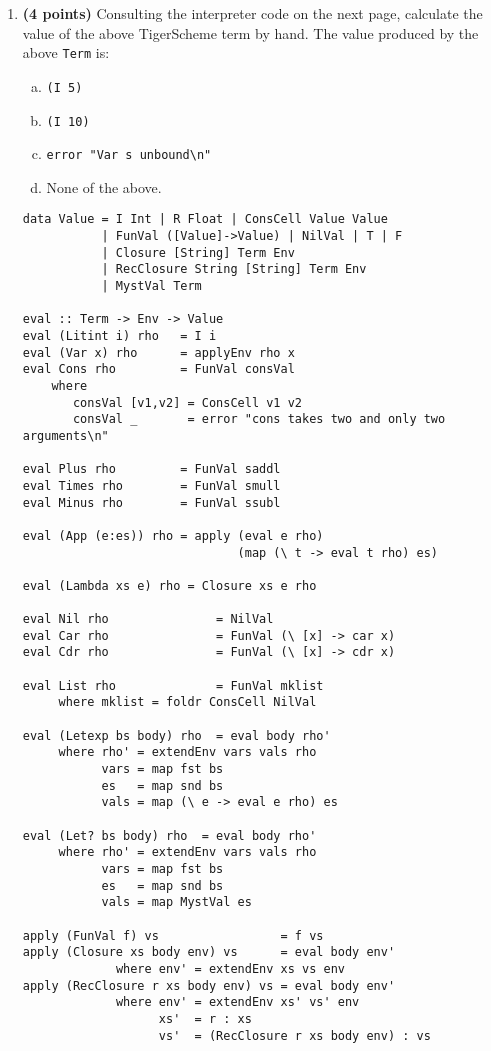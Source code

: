 \documentclass[12pt]{article}
\begin{document}
\begin{enumerate}
\item {\bf (4 points)} Consulting the interpreter code on the next page, calculate the value of the above TigerScheme term by hand.  The value produced by the above \verb+Term+ is:
\begin{enumerate}[(a)]
\item \verb+(I 5)+
\item \verb+(I 10)+
\item \verb+error "Var s unbound\n"+
\item None of the above.
\end{enumerate}

\newpage

{\footnotesize
\begin{verbatim}
data Value = I Int | R Float | ConsCell Value Value 
           | FunVal ([Value]->Value) | NilVal | T | F 
           | Closure [String] Term Env
           | RecClosure String [String] Term Env
           | MystVal Term

eval :: Term -> Env -> Value
eval (Litint i) rho   = I i
eval (Var x) rho      = applyEnv rho x
eval Cons rho         = FunVal consVal
    where 
       consVal [v1,v2] = ConsCell v1 v2
       consVal _       = error "cons takes two and only two arguments\n"

eval Plus rho         = FunVal saddl
eval Times rho        = FunVal smull
eval Minus rho        = FunVal ssubl

eval (App (e:es)) rho = apply (eval e rho)
                              (map (\ t -> eval t rho) es)

eval (Lambda xs e) rho = Closure xs e rho

eval Nil rho               = NilVal
eval Car rho               = FunVal (\ [x] -> car x)
eval Cdr rho               = FunVal (\ [x] -> cdr x)

eval List rho              = FunVal mklist
     where mklist = foldr ConsCell NilVal

eval (Letexp bs body) rho  = eval body rho'
     where rho' = extendEnv vars vals rho
           vars = map fst bs
           es   = map snd bs
           vals = map (\ e -> eval e rho) es

eval (Let? bs body) rho  = eval body rho'
     where rho' = extendEnv vars vals rho
           vars = map fst bs
           es   = map snd bs
           vals = map MystVal es

apply (FunVal f) vs                 = f vs
apply (Closure xs body env) vs      = eval body env'
             where env' = extendEnv xs vs env
apply (RecClosure r xs body env) vs = eval body env'
             where env' = extendEnv xs' vs' env
                   xs'  = r : xs
                   vs'  = (RecClosure r xs body env) : vs


\end{verbatim}}
\end{enumerate}
\end{document}
